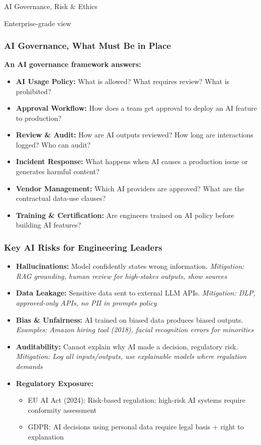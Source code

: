\begin{frame}[fragile]\frametitle{}
\begin{center}
{\Large AI Governance, Risk \& Ethics}

{\small Enterprise-grade view}
\end{center}
\end{frame}

\begin{frame}[fragile]\frametitle{AI Governance, What Must Be in Place}
\textbf{An AI governance framework answers:}
\begin{itemize}
\item \textbf{AI Usage Policy:} What is allowed? What requires review? What is prohibited?
\item \textbf{Approval Workflow:} How does a team get approval to deploy an AI feature to production?
\item \textbf{Review \& Audit:} How are AI outputs reviewed? How long are interactions logged? Who can audit?
\item \textbf{Incident Response:} What happens when AI causes a production issue or generates harmful content?
\item \textbf{Vendor Management:} Which AI providers are approved? What are the contractual data-use clauses?
\item \textbf{Training \& Certification:} Are engineers trained on AI policy before building AI features?
\end{itemize}
\end{frame}

\begin{frame}[fragile]\frametitle{Key AI Risks for Engineering Leaders}
\begin{itemize}
\item \textbf{Hallucinations:} Model confidently states wrong information.
  \textit{Mitigation: RAG grounding, human review for high-stakes outputs, show sources}
\item \textbf{Data Leakage:} Sensitive data sent to external LLM APIs.
  \textit{Mitigation: DLP, approved-only APIs, no PII in prompts policy}
\item \textbf{Bias \& Unfairness:} AI trained on biased data produces biased outputs.
  \textit{Examples: Amazon hiring tool (2018), facial recognition errors for minorities}
\item \textbf{Auditability:} Cannot explain why AI made a decision, regulatory risk.
  \textit{Mitigation: Log all inputs/outputs, use explainable models where regulation demands}
\item \textbf{Regulatory Exposure:}
  \begin{itemize}
  \item EU AI Act (2024): Risk-based regulation; high-risk AI systems require conformity assessment
  \item GDPR: AI decisions using personal data require legal basis + right to explanation
  \end{itemize}
\end{itemize}
\end{frame}

